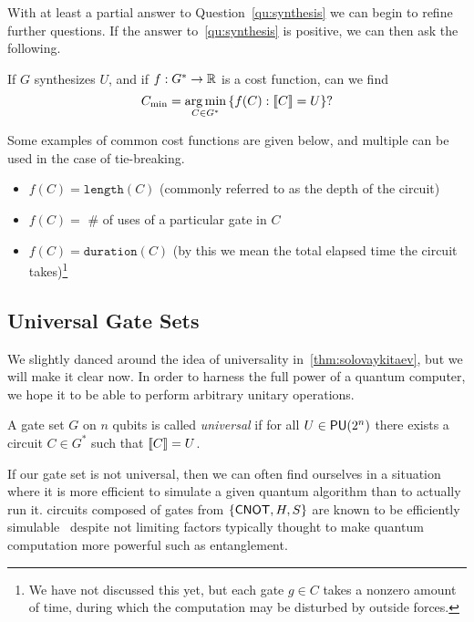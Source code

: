 With at least a partial answer to Question~\ref{qu:synthesis} we can begin to refine further questions.
If the answer to~\ref{qu:synthesis} is positive, we can then ask the following.
\begin{question}\label{qu:optimalsynthesis}
    If $G$ synthesizes $U$, and if $f: G^* \to \mathbb{R}$ is a cost function, can we find
    \begin{equation*}
        C_\text{min} = \operatorname*{arg\,min}_{C\in G^*} \qty{f(C) : \llbracket C\rrbracket = U}?
    \end{equation*}
\end{question}
Some examples of common cost functions are given below, and multiple can be used in the case of tie-breaking.
\begin{itemize}
    \item $f(C) = \mathtt{length}(C)$ (commonly referred to as the depth of the circuit)
    \item $f(C) = $ \# of uses of a particular gate in $C$
    \item $f(C) = \mathtt{duration}(C)$ (by this we mean the total elapsed time the circuit takes)\footnote{We have not discussed this yet, but each gate $g\in C$ takes a nonzero amount of time, during which the computation may be disturbed by outside forces.}
\end{itemize}

\subsection{Universal Gate Sets}\label{sec:universal}

We slightly danced around the idea of universality in~\cref{thm:solovaykitaev}, but we will make it clear now.
In order to harness the full power of a quantum computer, we hope it to be able to perform arbitrary unitary operations.
\begin{definition}
    A gate set $G$ on $n$ qubits is called \emph{universal} if for all $U \in \mathsf{PU} (2^n)$ there exists a circuit $C\in G^*$ such that $\llbracket C\rrbracket = U$.
\end{definition}
If our gate set is not universal, then we can often find ourselves in a situation where it is more efficient to simulate a given quantum algorithm than to actually run it.
\Eg{} circuits composed of gates from $\qty{\ensuremath{\mathsf{CNOT}}, H, S}$ are known to be efficiently simulable~\cite{gottesman-knill} despite not limiting factors typically thought to make quantum computation more powerful such as entanglement.

